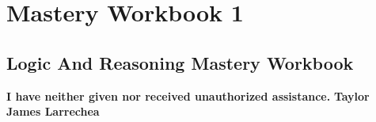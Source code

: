 \clearpage
\chapter{Mastery Workbook 1}

\section{Logic And Reasoning Mastery Workbook}


\begin{center}
    \Large{\textbf{I have neither given nor received unauthorized assistance.}}
    \large{\textbf{Taylor James Larrechea}}
\end{center}


